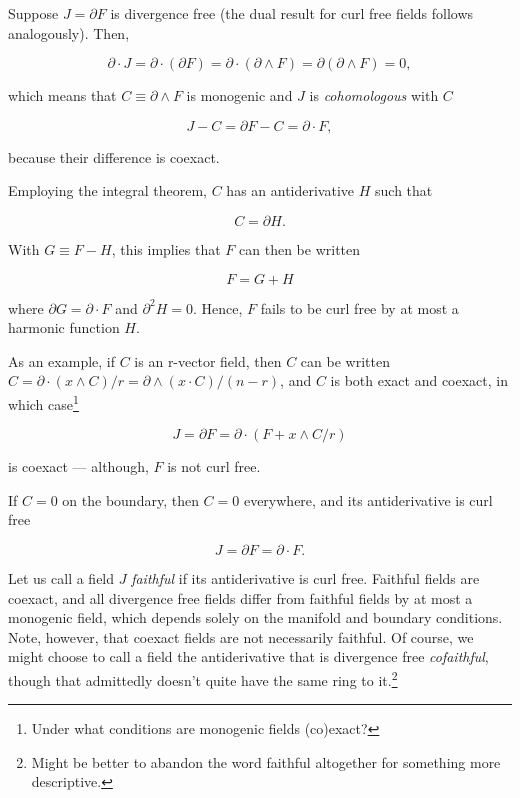 \documentclass{article}
\begin{document}
Suppose $J = \partial F$ is divergence free (the dual result for curl free fields follows analogously). Then, 

\begin{equation}
  \partial \cdot J = \partial \cdot (\partial F) = \partial \cdot (\partial \wedge F) = \partial (\partial \wedge F) = 0,
\end{equation}

which means that $C \equiv \partial \wedge F$ is monogenic and $J$ is \emph{cohomologous} with $C$

\begin{equation}
  J - C = \partial F - C = \partial \cdot F,\label{eq:cohomologous}
\end{equation}

because their difference is coexact.

Employing the integral theorem, $C$ has an antiderivative $H$ such that 

\begin{equation}
  C = \partial H.
\end{equation}

With $G \equiv F - H$, this implies that $F$ can then be written

\begin{equation}
  F = G + H\label{eq:harmonic-split}
\end{equation}

where $\partial G = \partial \cdot F$ and $\partial^2 H = 0$. Hence, $F$ fails to be curl free by at most a harmonic function $H$.

As an example, if $C$ is an r-vector field, then $C$ can be written $C = \partial \cdot (x \wedge C)/r = \partial \wedge (x \cdot C)/(n-r)$, and $C$ is both exact and coexact, in which case\footnote{Under what conditions are monogenic fields (co)exact?}

\begin{equation}
  J = \partial F = \partial \cdot (F + x \wedge C/r)
\end{equation}

is coexact --- although, $F$ is not curl free. 

If $C = 0$ on the boundary, then $C = 0$ everywhere, and its antiderivative is curl free

\begin{equation}
  J = \partial F = \partial \cdot F. \label{eq:faithful}
\end{equation}

Let us call a field $J$ \emph{faithful} if its antiderivative is curl free. Faithful fields are coexact, and all divergence free fields differ from faithful fields by at most a monogenic field, which depends solely on the manifold and boundary conditions. Note, however, that coexact fields are not necessarily faithful. Of course, we might choose to call a field the antiderivative that is divergence free \emph{cofaithful}, though that admittedly doesn't quite have the same ring to it.\footnote{Might be better to abandon the word faithful altogether for something more descriptive.}
\end{document}
